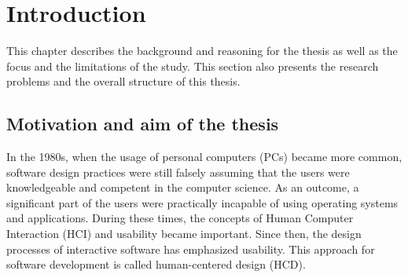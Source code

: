 \documentclass[12pt,a4paper,oneside,pdftex]{report}
\begin{document}


\label{pages-prelude}
\cleardoublepage

\startfirstchapter

\pagestyle{headings}


% 

\chapter{Introduction}
\label{chapter:introduction}
This chapter describes the background and reasoning for the thesis as well as the focus and the limitations of the study. This section also presents the research problems and the overall structure of this thesis. 

\section{Motivation and aim of the thesis}
\label{sec:motivationandaim}
In the 1980s, when the usage of personal computers (PCs) became more common, software design practices were still falsely assuming that the users were knowledgeable and competent in the computer science. As an outcome, a significant part of the users were practically incapable of using operating systems and applications. During these times, the concepts of Human Computer Interaction (HCI) and usability became important. Since then, the design processes of interactive software has emphasized usability. This approach for software development is called human-centered design (HCD). \cite{RefWorks:9}
\end{document}
